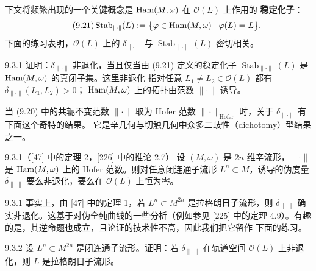 下文将频繁出现的一个关键概念是 $\operatorname{Ham}(M,\omega)$ 在 $\mathcal O(L)$ 上作用的
\textbf{稳定化子}：
\begin{equation}\tag{9.21}
  \operatorname{Stab}_{\|\cdot\|}(L)
  :=\bigl\{\varphi\in\operatorname{Ham}(M,\omega)\mid\varphi(L)=L\bigr\}.
\end{equation}
下面的练习表明，$\mathcal O(L)$ 上的 $\delta_{\|\cdot\|}$ 与
$\operatorname{Stab}_{\|\cdot\|}(L)$ 密切相关。

\begin{wexer}{9.3.1}
  证明：$\delta_{\|\cdot\|}$ 非退化，当且仅当由 (9.21) 定义的稳定化子
  $\operatorname{Stab}_{\|\cdot\|}(L)$ 是 $\operatorname{Ham}(M,\omega)$ 的真闭子集。这里非退化
  指对任意 $L_1\neq L_2\in\mathcal O(L)$ 都有 $\delta_{\|\cdot\|}(L_1,L_2)>0$；
  $\operatorname{Ham}(M,\omega)$ 上的拓扑由范数 $\|\cdot\|$ 诱导。
\end{wexer}

当 (9.20) 中的共轭不变范数 $\|\cdot\|$ 取为 Hofer 范数
$\|\cdot\|_{\mathrm{Hofer}}$ 时，关于 $\delta_{\|\cdot\|}$ 有下面这个奇特的结果。
它是辛几何与切触几何中众多二歧性（dichotomy）型结果之一。

\begin{wthm}{9.3.1}（[47] 中的定理 2，[226] 中的推论 2.7）
  设 $(M,\omega)$ 是 $2n$ 维辛流形，$\|\cdot\|$ 是 $\operatorname{Ham}(M,\omega)$ 上的 Hofer
  范数。则对任意闭连通子流形 $L^n\subset M$，诱导的伪度量
  $\delta_{\|\cdot\|}$ 要么非退化，要么在 $\mathcal O(L)$ 上恒为零。
\end{wthm}

\begin{wrem}{9.3.1}
  事实上，由 [47] 中的定理 1，若 $L^n\subset M^{2n}$ 是拉格朗日子流形，则
  $\delta_{\|\cdot\|}$ 确实非退化。这基于对伪全纯曲线的一些分析（例如参见 [225]
  中的定理 4.9）。有趣的是，其逆命题也成立，且论证的技术性不高，因此我们把它留作
  下面的练习。
\end{wrem}

\begin{wexer}{9.3.2}
  设 $L^n\subset M^{2n}$ 是闭连通子流形。证明：若 $\delta_{\|\cdot\|}$ 在轨道空间
  $\mathcal O(L)$ 上非退化，则 $L$ 是拉格朗日子流形。
\end{wexer}

